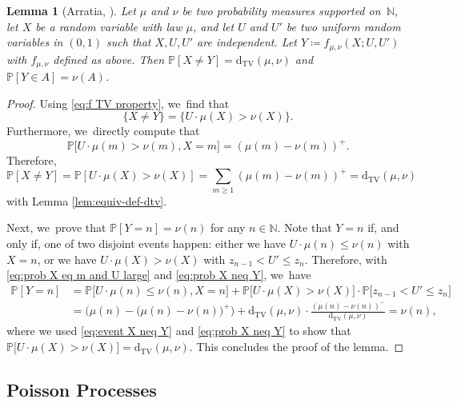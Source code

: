 \documentclass[JEP,XML,SOM,Unicode,published]{cedram}
\newcommand{\NN}{\mathbb{N}}
\newcommand{\PP}{\mathbb{P}}
\newcommand{\dtv}{\mathrm{d}_{\mathrm{TV}}}
\newcommand{\bg}{\big}
\newcommand{\bgg}{\Big}
\theoremstyle{plain}
\newtheorem{lem}[cor]{Lemma}
\theoremstyle{definition}
\begin{document}
\begin{lem}[Arratia, \cite{Arratia02}]
\label{lem:coupling-dtv}
Let $\mu$ and $\nu$ be two probability measures supported on~$\NN$, let $X$ be a random variable with law $\mu$, and let $U$ and $U'$ be two uniform random variables in $(0, 1)$ such that $X, U, U'$ are independent. Let $Y \coloneqq f_{\mu, \nu}(X; U, U')$ with $f_{\mu, \nu}$ defined as above. Then $\PP[X \ne Y] = \dtv(\mu, \nu)$ and $\PP[Y \in A] = \nu(A)$.
\end{lem}

\begin{proof}
Using \eqref{eq:f TV property}, we~find that
\begin{equation}
\label{eq:event X neq Y}
\{X \ne Y\}=\{U \cdot \mu(X) > \nu(X)\}.
\end{equation}
Furthermore, we~directly compute that
\begin{equation}
\label{eq:prob X eq m and U large}
\PP\bg[U\cdot \mu(m)> \nu(m), X = m\bg] = (\mu(m) - \nu(m))^+.
\end{equation}
Therefore,
\begin{equation}
\label{eq:prob X neq Y}
\PP[X \ne Y] = \PP[U \cdot \mu(X) > \nu(X)] = \sum_{m \ge 1} (\mu(m) - \nu(m))^+ = \dtv(\mu, \nu)
\end{equation}
with Lemma \ref{lem:equiv-def-dtv}.

Next, we~prove that $\PP[Y = n] = \nu(n)$ for any $n \in \NN$. Note that $Y = n$ if, and only if, one of two disjoint events happen: either we have $U \cdot \mu(n)\le \nu(n)$ with $X = n$, or we have $U\cdot \mu(X) > \nu(X)$ with $z_{n-1} < U' \le z_n$. Therefore, with \eqref{eq:prob X eq m and U large} and \eqref{eq:prob X neq Y}, we~have
\begin{align*}
\PP[Y = n]
&= \PP\bg[U \cdot \mu(n)\le \nu(n), X = n\bg] + \PP\bg[U\cdot \mu(X) > \nu(X)\bg] \cdot \PP\bg[z_{n-1} < U' \le z_n\bg] \\
&= \bgg(\mu(n) - \bg(\mu(n) - \nu(n)\bg)^+\bgg) + \dtv(\mu, \nu) \cdot \frac{(\mu(n) - \nu(n))^-}{\dtv(\mu, \nu)} = \nu(n),
\end{align*}
where we used \eqref{eq:event X neq Y} and \eqref{eq:prob X neq Y} to show that $\PP\bg[U\cdot \mu(X) > \nu(X)\bg]=\dtv(\mu,\nu)$.
This concludes the proof of the lemma.
\end{proof}

\subsection{Poisson Processes}
\end{document}

